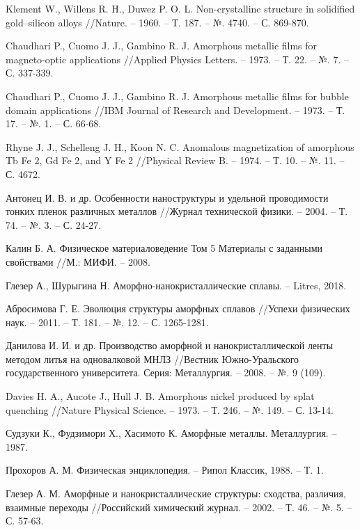 \documentclass[master,14pt,subf,href,colorlinks=true]{disser}
\begin{document}
\begin{thebibliography}{44}
	Klement W., Willens R. H., Duwez P. O. L. Non-crystalline structure in solidified gold–silicon alloys //Nature. – 1960. – Т. 187. – №. 4740. – С. 869-870.
	
	Chaudhari P., Cuomo J. J., Gambino R. J. Amorphous metallic films for magneto‐optic applications //Applied Physics Letters. – 1973. – Т. 22. – №. 7. – С. 337-339.
	
	Chaudhari P., Cuomo J. J., Gambino R. J. Amorphous metallic films for bubble domain applications //IBM Journal of Research and Development. – 1973. – Т. 17. – №. 1. – С. 66-68.
	
	Rhyne J. J., Schelleng J. H., Koon N. C. Anomalous magnetization of amorphous Tb Fe 2, Gd Fe 2, and Y Fe 2 //Physical Review B. – 1974. – Т. 10. – №. 11. – С. 4672.
	
	Антонец И. В. и др. Особенности наноструктуры и удельной проводимости тонких пленок различных металлов //Журнал технической физики. – 2004. – Т. 74. – №. 3. – С. 24-27.
	
	Калин Б. А. Физическое материаловедение Том 5 Материалы с заданными свойствами //М.: МИФИ. – 2008.
	
	Глезер А., Шурыгина Н. Аморфно-нанокристаллические сплавы. – Litres, 2018.
	
	Абросимова Г. Е. Эволюция структуры аморфных сплавов //Успехи физических наук. – 2011. – Т. 181. – №. 12. – С. 1265-1281.
	
	Данилова И. И. и др. Производство аморфной и нанокристаллической ленты методом литья на одновалковой МНЛЗ //Вестник Южно-Уральского государственного университета. Серия: Металлургия. – 2008. – №. 9 (109).
	
	Davies H. A., Aucote J., Hull J. B. Amorphous nickel produced by splat quenching //Nature Physical Science. – 1973. – Т. 246. – №. 149. – С. 13-14.
	

	
	Судзуки К., Фудзимори Х., Хасимото К. Аморфные металлы. Металлургия. – 1987.
	
	Прохоров А. М. Физическая энциклопедия. – Рипол Классик, 1988. – Т. 1.
	
	Глезер А. М. Аморфные и нанокристаллические структуры: сходства, различия, взаимные переходы //Российский химический журнал. – 2002. – Т. 46. – №. 5. – С. 57-63.
	

\end{thebibliography}
\end{document}
